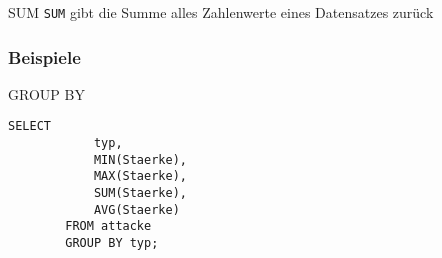 \begin{sql}{SUM}
    \texttt{SUM} gibt die Summe alles Zahlenwerte eines Datensatzes zurück
\end{sql}

\subsubsection{Beispiele}

\begin{example}{GROUP BY}
    \begin{lstlisting}[language=mysql]
        SELECT
            typ,
            MIN(Staerke),
            MAX(Staerke),
            SUM(Staerke),
            AVG(Staerke)
        FROM attacke
        GROUP BY typ;
    \end{lstlisting}


\end{example}
